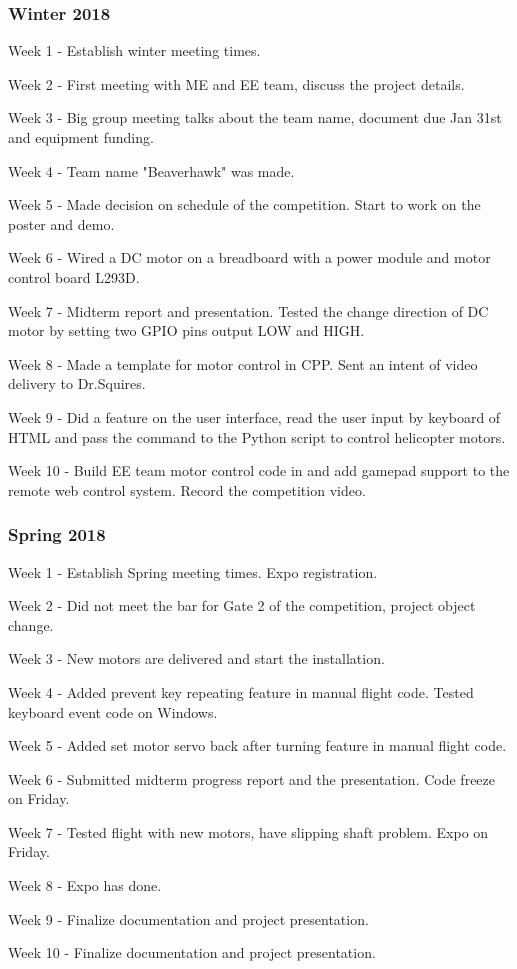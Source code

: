 \documentclass[onecolumn, draftclsnofoot,10pt, compsoc]{IEEEtran}
\begin{document}
\subsubsection{Winter 2018}
		\begin{description}
			\item{Week 1} - Establish winter meeting times.
			\item{Week 2} - First meeting with ME and EE team, discuss the project details.
			\item{Week 3} - Big group meeting talks about the team name, document due Jan 31st and equipment funding.		
            \item{Week 4} - Team name "Beaverhawk" was made.
			\item{Week 5} - Made decision on schedule of the competition. Start to work on the poster and demo.
			\item{Week 6} - Wired a DC motor on a breadboard with a power module and motor control board L293D.
            \item{Week 7} - Midterm report and presentation. Tested the change direction of DC motor by setting two GPIO pins output LOW and HIGH.
			\item{Week 8} - Made a template for motor control in CPP. Sent an intent of video delivery to Dr.Squires.
			\item{Week 9} - Did a feature on the user interface, read the user input by keyboard of HTML and pass the command to the Python script to control helicopter motors.
            \item{Week 10} - Build EE team motor control code in and add gamepad support to the remote web control system. Record the competition video.
		\end{description}
\subsubsection{Spring 2018}
		\begin{description}
			\item{Week 1} - Establish Spring meeting times. Expo registration.
			\item{Week 2} - Did not meet the bar for Gate 2 of the competition, project object change.
			\item{Week 3} - New motors are delivered and start the installation. 		
            \item{Week 4} - Added prevent key repeating feature in manual flight code. Tested keyboard event code on Windows. 
			\item{Week 5} - Added set motor servo back after turning feature in manual flight code. 
			\item{Week 6} - Submitted midterm progress report and the presentation. Code freeze on Friday.
            \item{Week 7} - Tested flight with new motors, have slipping shaft problem. Expo on Friday.
			\item{Week 8} - Expo has done.
			\item{Week 9} - Finalize documentation and project presentation.
            \item{Week 10} - Finalize documentation and project presentation.
		\end{description}
\end{document}
